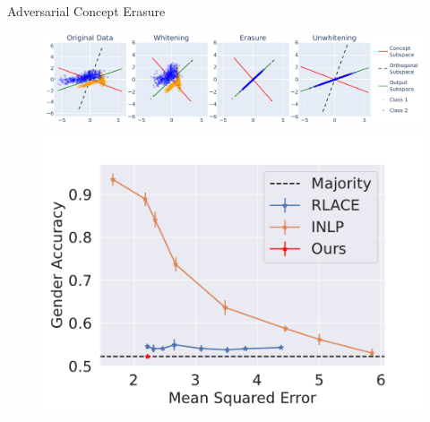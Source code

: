 \documentclass[10pt]{beamer}
\newcommand{\themename}{\textbf{\textsc{metropolis}}\xspace}
\begin{document}
\begin{frame}{Adversarial Concept Erasure}

\begin{figure}[t]
    \includegraphics[width=0.6\columnwidth]{assets/leace-process.pdf}
    \includegraphics[width=0.5\columnwidth]{assets/lease-lace-inlp-acc-vs-mse.pdf}
\end{figure} 

\cite{pmlr-v162-ravfogel22a}

\cite{belrose2023leaceperfectlinearconcept}
\end{frame}

\appendix





\end{document}
